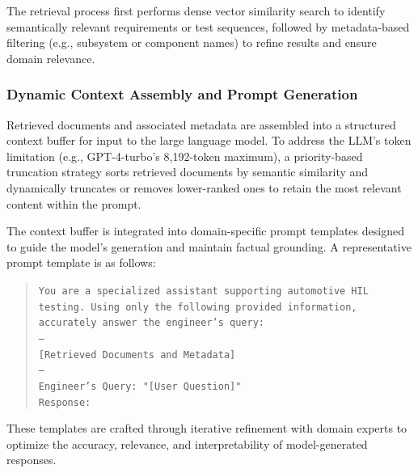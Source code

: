 \documentclass[a4paper,fleqn]{cas-dc}
\renewcommand{\textit}[1]{#1}
\begin{document}
The retrieval process first performs \textit{dense vector similarity} search to identify semantically relevant requirements or test sequences, followed by \textit{metadata-based filtering} (e.g., subsystem or component names) to refine results and ensure domain relevance.

\subsubsection{Dynamic Context Assembly and Prompt Generation}
Retrieved documents and associated metadata are assembled into a structured context buffer for input to the large language model. To address the LLM’s token limitation (e.g., GPT-4-turbo’s 8,192-token maximum), a priority-based truncation strategy sorts retrieved documents by semantic similarity and dynamically truncates or removes lower-ranked ones to retain the most relevant content within the prompt.

The context buffer is integrated into domain-specific prompt templates designed to guide the model's generation and maintain factual grounding. A representative prompt template is as follows:
\begin{quote}\small
\texttt{You are a specialized assistant supporting automotive HIL testing. Using only the following provided information, accurately answer the engineer's query:} \\
\texttt{---}\\
\texttt{[Retrieved Documents and Metadata]}\\
\texttt{---}\\
\texttt{Engineer’s Query: "[User Question]"}\\
\texttt{Response:}
\end{quote}

These templates are crafted through iterative refinement with domain experts to optimize the accuracy, relevance, and interpretability of model-generated responses.
\end{document}
